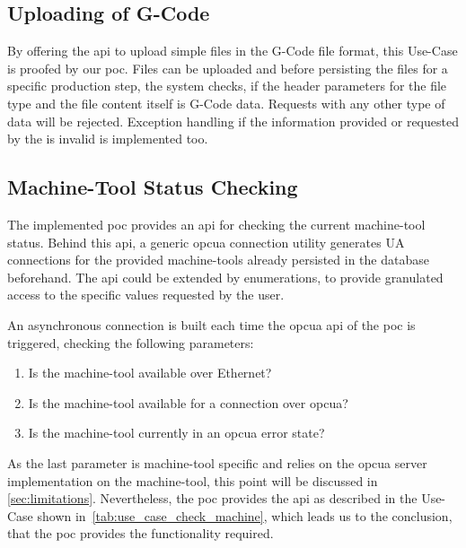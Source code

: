 \documentclass[
a4paper,
twoside,
headsepline,
cleardoublepage=empty,
parskip=half,
draft=false
]{scrbook}
\begin{document}
			\subsection{Uploading of G-Code}\label{subsec:uploading_g_code}

				By offering the \gls{api} to upload simple files in the G-Code file format, this Use-Case is proofed by our \gls{poc}. Files can be uploaded and before persisting the files for a specific production step, the system checks, if the header parameters for the file type and the file content itself is G-Code data. Requests with any other type of data will be rejected. Exception handling if the information provided or requested by the is invalid is implemented too.

			\subsection{Machine-Tool Status Checking}\label{subsec:machine_tool_status_checking}

				The implemented \gls{poc} provides an \gls{api} for checking the current machine-tool status. Behind this \gls{api}, a generic \gls{opcua} connection utility generates UA connections for the provided machine-tools already persisted in the database beforehand. The \gls{api} could be extended by enumerations, to provide granulated access to the specific values requested by the user.

				An asynchronous connection is built each time the \gls{opcua} \gls{api} of the \gls{poc} is triggered, checking the following parameters:

				\begin{enumerate}
					\item Is the machine-tool available over Ethernet?
					\item Is the machine-tool available for a connection over \gls{opcua}?
					\item Is the machine-tool currently in an \gls{opcua} error state?
				\end{enumerate}

				As the last parameter is machine-tool specific and relies on the \gls{opcua} server implementation on the machine-tool, this point will be discussed in \cref{sec:limitations}. Nevertheless, the \gls{poc} provides the \gls{api} as described in the Use-Case shown in~\cref{tab:use_case_check_machine}, which leads us to the conclusion, that the \gls{poc} provides the functionality required.
\end{document}

